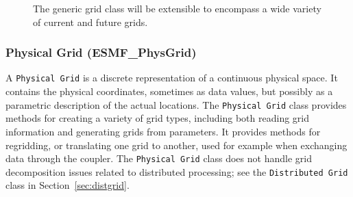 \begin{figure}
\caption[{Grid Specialization}]{The generic grid class will be extensible to
encompass a wide variety of current and future grids.}
\label{fig:GridStyleDiagram}
\end{figure}

\subsubsection{Physical Grid (ESMF\_PhysGrid)}
\label{sec:physgrid} 
A {\tt Physical Grid} is a discrete representation of a continuous physical space.  It contains the physical coordinates, sometimes as data values, but possibly
as a parametric description of the actual locations.  
The {\tt Physical Grid} class provides methods for creating a variety of grid 
types, including both reading grid information
and generating grids from parameters.  It provides methods for regridding, or translating
one grid to another, used for example when exchanging data through the coupler.
The {\tt Physical Grid} class does not handle grid decomposition issues related to 
distributed processing; see the {\tt Distributed Grid} class in 
Section~\ref{sec:distgrid}.

